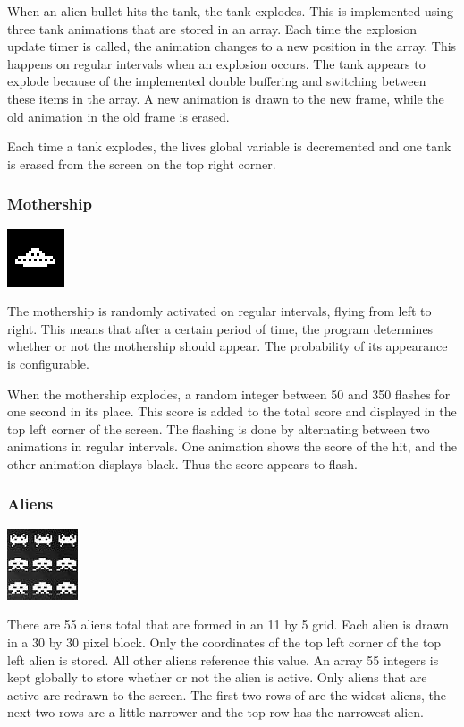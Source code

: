\documentclass[11pt,letter,oneside]{report}
\begin{document}
When an alien bullet hits the tank, the tank explodes. This is implemented using three tank animations that are stored in an array. Each time the explosion update timer is called, the animation changes to a new position in the array. This happens on regular intervals when an explosion occurs. The tank appears to explode because of the implemented double buffering and switching between these items in the array. A new animation is drawn to the new frame, while the old animation in the old frame is erased.

Each time a tank explodes, the lives global variable is decremented and one tank is erased from the screen on the top right corner.

\subsubsection{Mothership}
\includegraphics[]{big-alien.png}

The mothership is randomly activated on regular intervals, flying from left to right. This means that after a certain period of time, the program determines whether or not the mothership should appear. The probability of its appearance is configurable.

When the mothership explodes, a random integer between 50 and 350 flashes for one second in its place. This score is added to the total score and displayed in the top left corner of the screen. The flashing is done by alternating between two animations in regular intervals. One animation shows the score of the hit, and the other animation displays black. Thus the score appears to flash.

\subsubsection{Aliens}
\includegraphics[]{aliens.jpg}

There are 55 aliens total that are formed in an 11 by 5 grid. Each alien is drawn in a 30 by 30 pixel block. Only the coordinates of the top left corner of the top left alien is stored. All other aliens reference this value. An array 55 integers is kept globally to store whether or not the alien is active. Only aliens that are active are redrawn to the screen. The first two rows of are the widest aliens, the next two rows are a little narrower and the top row has the narrowest alien.
\end{document}
